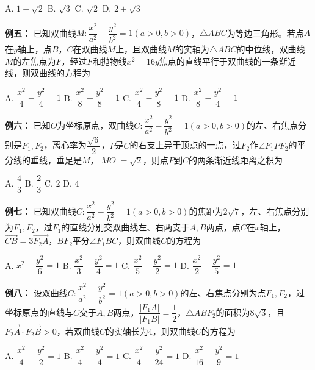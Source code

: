 \documentclass{article}
\begin{document}
A. $1+\sqrt{2}$ \quad B. $\sqrt{3}$ \quad C. $\sqrt{2}$ \quad D. $2+\sqrt{3}$
\vspace{4\baselineskip}

\noindent\textbf{例五：} 已知双曲线$M:\dfrac{x^2}{a^2}-\dfrac{y^2}{b^2}=1(a>0,b>0)$，$\triangle ABC$为等边三角形。若点$A$在$y$轴上，点$B$，$C$在双曲线$M$上，且双曲线$M$的实轴为$\triangle ABC$的中位线，双曲线$M$的左焦点为$F$，经过$F$和抛物线$x^2=16y$焦点的直线平行于双曲线的一条渐近线，则双曲线的方程为
\vspace{0.5em}

A. $\dfrac{x^2}{4}-\dfrac{y^2}{4}=1$ \quad B. $\dfrac{x^2}{8}-\dfrac{y^2}{8}=1$ \quad C. $\dfrac{x^2}{4}-\dfrac{y^2}{8}=1$ \quad D. $\dfrac{x^2}{8}-\dfrac{y^2}{4}=1$
\vspace{4\baselineskip}

\noindent\textbf{例六：} 已知$O$为坐标原点，双曲线$C:\dfrac{x^2}{a^2}-\dfrac{y^2}{b^2}=1(a>0,b>0)$的左、右焦点分别是$F_1,F_2$，离心率为$\dfrac{\sqrt{6}}{2}$，$P$是$C$的右支上异于顶点的一点，过$F_2$作$\angle F_1PF_2$的平分线的垂线，垂足是$M$，$|MO|=\sqrt{2}$，则点$P$到$C$的两条渐近线距离之积为
\vspace{0.5em}

A. $\dfrac{4}{3}$ \quad B. $\dfrac{2}{3}$ \quad C. $2$ \quad D. $4$
\vspace{4\baselineskip}

\noindent\textbf{例七：} 已知双曲线$C:\dfrac{x^2}{a^2}-\dfrac{y^2}{b^2}=1(a>0,b>0)$的焦距为$2\sqrt{7}$，左、右焦点分别为$F_1,F_2$，过$F_1$的直线分别交双曲线左、右两支于$A,B$两点，点$C$在$x$轴上，$\overrightarrow{CB}=3\overrightarrow{F_2A}$，$BF_2$平分$\angle F_1BC$，则双曲线$C$的方程为
\vspace{0.5em}

A. $x^2-\dfrac{y^2}{6}=1$ \quad B. $\dfrac{x^2}{3}-\dfrac{y^2}{4}=1$ \quad C. $\dfrac{x^2}{5}-\dfrac{y^2}{2}=1$ \quad D. $\dfrac{x^2}{2}-\dfrac{y^2}{5}=1$
\vspace{4\baselineskip}

\noindent\textbf{例八：} 设双曲线$C:\dfrac{x^2}{a^2}-\dfrac{y^2}{b^2}=1(a>0,b>0)$的左、右焦点分别为点$F_1,F_2$，过坐标原点的直线与$C$交于$A,B$两点，$\dfrac{|F_1A|}{|F_1B|}=\dfrac{1}{2}$，$\triangle ABF_2$的面积为$8\sqrt{3}$，且$\overrightarrow{F_2A} \cdot \overrightarrow{F_2B}>0$，若双曲线$C$的实轴长为$4$，则双曲线$C$的方程为
\vspace{0.5em}

A. $\dfrac{x^2}{4}-\dfrac{y^2}{2}=1$ \quad B. $\dfrac{x^2}{4}-\dfrac{y^2}{4}=1$ \quad C. $\dfrac{x^2}{4}-\dfrac{y^2}{24}=1$ \quad D. $\dfrac{x^2}{16}-\dfrac{y^2}{9}=1$
\vspace{4\baselineskip}
\end{document}
